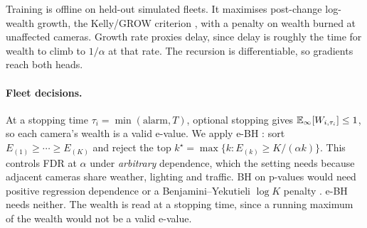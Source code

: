 Training is offline on held-out simulated fleets. It maximises post-change log-wealth growth, the Kelly/GROW criterion \citep{kelly1956}, with a penalty on wealth burned at unaffected cameras. Growth rate proxies delay, since delay is roughly the time for wealth to climb to $1/\alpha$ at that rate. The recursion is differentiable, so gradients reach both heads.

\paragraph{Fleet decisions.}
At a stopping time $\tau_i = \min(\text{alarm}, T)$, optional stopping gives $\mathbb{E}_{\infty}[W_{i,\tau_i}] \le 1$, so each camera's wealth is a valid e-value. We apply e-BH \citep{wang2022ebh}: sort $E_{(1)} \ge \cdots \ge E_{(K)}$ and reject the top $k^\star = \max\{k : E_{(k)} \ge K/(\alpha k)\}$. This controls FDR at $\alpha$ under \emph{arbitrary} dependence, which the setting needs because adjacent cameras share weather, lighting and traffic. BH on p-values would need positive regression dependence or a Benjamini--Yekutieli $\log K$ penalty \citep{benjamini2001}. e-BH needs neither. The wealth is read at a stopping time, since a running maximum of the wealth would not be a valid e-value.
